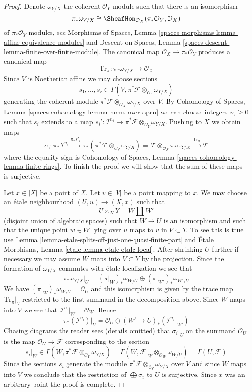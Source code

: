 \begin{proof}
Denote $\omega_{Y/X}$ the coherent $\mathcal{O}_Y$-module such that there
is an isomorphism
$$
\pi_*\omega_{Y/X} \cong
\SheafHom_{\mathcal{O}_X}(\pi_*\mathcal{O}_Y, \mathcal{O}_X)
$$
of $\pi_*\mathcal{O}_Y$-modules, see Morphisms of Spaces, Lemma
\ref{spaces-morphisms-lemma-affine-equivalence-modules} and
Descent on Spaces, Lemma \ref{spaces-descent-lemma-finite-over-finite-module}.
The canonical map $\mathcal{O}_X \to \pi_*\mathcal{O}_Y$
produces a canonical map
$$
\text{Tr}_\pi : \pi_*\omega_{Y/X} \longrightarrow \mathcal{O}_X
$$
Since $V$ is Noetherian affine we may choose sections
$$
s_1, \ldots, s_r \in
\Gamma(V, \pi^*\mathcal{F} \otimes_{\mathcal{O}_Y} \omega_{Y/X})
$$
generating the coherent module
$\pi^*\mathcal{F} \otimes_{\mathcal{O}_X} \omega_{Y/X}$
over $V$. By
Cohomology of Spaces, Lemma \ref{spaces-cohomology-lemma-homs-over-open}
we can choose integers $n_i \geq 0$ such that $s_i$
extends to a map
$s_i' : \mathcal{I}^{n_i} \to
\pi^*\mathcal{F} \otimes_{\mathcal{O}_Y} \omega_{Y/X}$.
Pushing to $X$ we obtain maps
$$
\sigma_i :
\pi_*\mathcal{I}^{n_i}
\xrightarrow{\pi_*s'_i}
\pi_*(\pi^*\mathcal{F} \otimes_{\mathcal{O}_Y} \omega_{Y/X}) =
\mathcal{F} \otimes_{\mathcal{O}_X} \pi_*\omega_{Y/X}
\xrightarrow{\text{Tr}_\pi} \mathcal{F}
$$
where the equality sign is
Cohomology of Spaces, Lemma \ref{spaces-cohomology-lemma-finite-rings}.
To finish the proof we will show that the sum of these maps is surjective.

\medskip\noindent
Let $x \in |X|$ be a point of $X$. Let $v \in |V|$ be a point mapping to $x$.
We may choose an \'etale neighbourhood $(U, u) \to (X, x)$ such that
$$
U \times_X Y = W \coprod W'
$$
(disjoint union of algebraic spaces) such that $W \to U$ is an
isomorphism and such that the unique point $w \in W$ lying over
$u$ maps to $v$ in $V \subset Y$. To see this is true use
Lemma \ref{lemma-etale-splits-off-just-one-quasi-finite-part} and
\'Etale Morphisms, Lemma \ref{etale-lemma-etale-etale-local}.
After shrinking $U$ further if necessary we may assume $W$ maps into
$V \subset Y$ by the projection. Since the formation of $\omega_{Y/X}$
commutes with \'etale localization we see that
$$
\pi_*\omega_{Y/X}|_U = (\pi|_W)_*\omega_{W/U} \oplus (\pi|_{W'})_*\omega_{W'/U}
$$
We have $(\pi|_W)_*\omega_{W/U} = \mathcal{O}_U$ and this isomorphism
is given by the trace map $\text{Tr}_\pi|_U$ restricted
to the first summand in the decomposition above. Since $W$ maps
into $V$ we see that $\mathcal{I}^{n_i}|_W = \mathcal{O}_W$.
Hence
$$
\pi_*(\mathcal{I}^{n_i})|_U = \mathcal{O}_U \oplus
(W' \to U)_*(\mathcal{I}^{n_i}|_{W'})
$$
Chasing diagrams the reader sees (details omitted) that $\sigma_i|_U$
on the summand $\mathcal{O}_U$ is the map $\mathcal{O}_U \to \mathcal{F}$
corresponding to the section
$$
s_i|_W  \in
\Gamma(W,\pi^*\mathcal{F} \otimes_{\mathcal{O}_Y} \omega_{Y/X})
=
\Gamma(W, \mathcal{F}|_W \otimes_{\mathcal{O}_W} \omega_{W/U})
=
\Gamma(U, \mathcal{F})
$$
Since the sections $s_i$ generate the module
$\pi^*\mathcal{F} \otimes_{\mathcal{O}_Y} \omega_{Y/X}$
over $V$ and since $W$ maps into $V$ we conclude
that the restriction of $\bigoplus \sigma_i$ to $U$ is surjective.
Since $x$ was an arbitrary point the proof is complete.
\end{proof}

